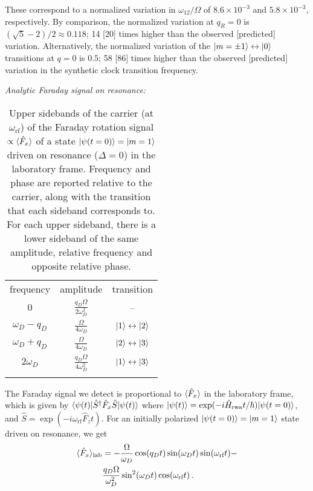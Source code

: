 \documentclass[aps,prl,reprint,superscriptaddress,floatfix]{revtex4-1}
\begin{document}
\begin{itemize}
    These correspond to a normalized variation in $\omega_{12}/\Omega$ of $8.6\times10^{-3}$ and $5.8\times10^{-3}$, respectively.
    By comparison, the normalized variation at $q_R=0$ is $(\sqrt{5}-2)/2 \approx 0.118$; 14 [20] times higher than the observed [predicted] variation.
    Alternatively, the normalized variation of the $\vert m=\pm1 \rangle  \leftrightarrow \vert 0 \rangle $ transitions at $q=0$ is $0.5$; 58 [86] times higher than the observed [predicted] variation in the synthetic clock transition frequency.
\end{itemize}
\textit{Analytic Faraday signal on resonance:}
\begin{table}[t]
\centering
\caption{Upper sidebands of the carrier (at $\omega_{\text{rf}}$) of the Faraday rotation signal $\propto \langle \hat{F}_x \rangle$ of a state $\vert \psi(t=0) \rangle =\vert m=1 \rangle $ driven on resonance ($\Delta = 0$) in the laboratory frame. Frequency and phase are reported relative to the carrier, along with the transition that each sideband corresponds to. For each upper sideband, there is a lower sideband of the same amplitude, relative frequency and opposite \note{$\pi$} relative phase.}
\label{tab:sidebands}
\begin{tabular}{ccc}
\hhline{===}
frequency & amplitude & transition \\ \hhline{---}
 $0$ & $\frac{q_D \Omega }{2 \omega_D^2}$ & -- \\
 $\omega_D-q_D$ & $\frac{\Omega}{4 \omega_D}$ & $\vert 1 \rangle  \leftrightarrow \vert 2 \rangle $ \\
 $\omega_D+q_D$ & $\frac{\Omega}{4 \omega_D}$ & $\vert 2 \rangle  \leftrightarrow \vert 3 \rangle $\\
 $2 \omega_D$ & $\frac{q_D \Omega}{4 \omega_D^2}$ & $\vert 1 \rangle  \leftrightarrow \vert 3 \rangle $ \\ \hhline{===}
\end{tabular}
\end{table}
The Faraday signal we detect is proportional to $\langle \hat{F}_x \rangle$ in the laboratory frame, which is given by $\langle \psi(t) \vert \hat{S}^{\dagger} \hat{F}_x \hat{S} \vert \psi(t) \rangle $ where $\vert \psi(t) \rangle  = \exp(-i \hat{H}_{\text{rwa}} t/\hbar) \vert \psi(t=0) \rangle $, and $\hat{S} = \exp(-i \omega_{\text{rf}} \hat{F}_z t)$.
For an initially polarized $\vert \psi(t=0) \rangle  = \vert m=1 \rangle $ state driven on resonance, we get
    \begin{align*}
        \langle \hat{F}_x \rangle_{\text{lab}} &= -\frac{\Omega}{\omega_D} \cos(q_D t) \sin(\omega_D t) \sin(\omega_{\text{rf}} t) - \\ &\frac{q_D \Omega}{\omega_D^2} \sin^2(\omega_D t) \cos(\omega_{\text{rf}} t) \, .
    \end{align*}
\end{document}
